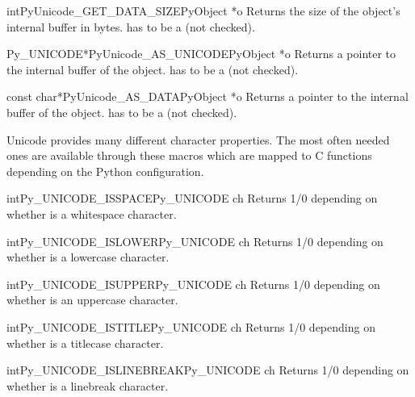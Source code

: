 \begin{cfuncdesc}{int}{PyUnicode_GET_DATA_SIZE}{PyObject *o}
  Returns the size of the object's internal buffer in bytes.  
  has to be a  (not checked).
\end{cfuncdesc}

\begin{cfuncdesc}{Py_UNICODE*}{PyUnicode_AS_UNICODE}{PyObject *o}
  Returns a pointer to the internal  buffer of the
  object.   has to be a  (not checked).
\end{cfuncdesc}

\begin{cfuncdesc}{const char*}{PyUnicode_AS_DATA}{PyObject *o}
  Returns a pointer to the internal buffer of the object.
   has to be a  (not checked).
\end{cfuncdesc}


Unicode provides many different character properties. The most often
needed ones are available through these macros which are mapped to C
functions depending on the Python configuration.

\begin{cfuncdesc}{int}{Py_UNICODE_ISSPACE}{Py_UNICODE ch}
  Returns 1/0 depending on whether  is a whitespace
  character.
\end{cfuncdesc}

\begin{cfuncdesc}{int}{Py_UNICODE_ISLOWER}{Py_UNICODE ch}
  Returns 1/0 depending on whether  is a lowercase character.
\end{cfuncdesc}

\begin{cfuncdesc}{int}{Py_UNICODE_ISUPPER}{Py_UNICODE ch}
  Returns 1/0 depending on whether  is an uppercase
  character.
\end{cfuncdesc}

\begin{cfuncdesc}{int}{Py_UNICODE_ISTITLE}{Py_UNICODE ch}
  Returns 1/0 depending on whether  is a titlecase character.
\end{cfuncdesc}

\begin{cfuncdesc}{int}{Py_UNICODE_ISLINEBREAK}{Py_UNICODE ch}
  Returns 1/0 depending on whether  is a linebreak character.
\end{cfuncdesc}


